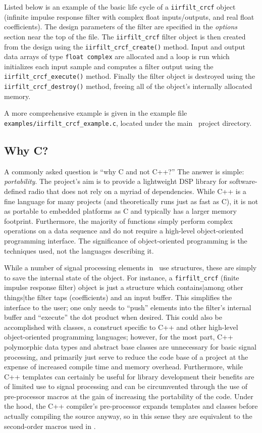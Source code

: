 Listed below is an example of the basic life cycle of a
{\tt iirfilt\_crcf} object (infinite impulse response filter with
complex float inputs/outputs, and real float coefficients).
The design parameters of the filter are specified in the {\em options}
section near the top of the file.
The {\tt iirfilt\_crcf} filter object is then created from the design
using the {\tt iirfilt\_crcf\_create()} method.
Input and output data arrays of type {\tt float complex} are allocated
and a loop is run which initializes each input sample and computes a
filter output using the {\tt iirfilt\_crcf\_execute()} method.
Finally the filter object is destroyed using the
{\tt iirfilt\_crcf\_destroy()} method,
freeing all of the object's internally allocated memory.
%

%
A more comprehensive example is given in the example file
{\tt examples/iirfilt\_crcf\_example.c},
located under the main \liquid\ project directory.

\subsection{Why C?}
\label{section:data_structures:why_C}
A commonly asked question is ``why C and not C++?''
The answer is simple: {\em portability}.
The project's aim is to provide a lightweight DSP library for
software-defined radio that does not rely on a myriad of dependencies.
While C++ is a fine language for many projects
(and theoretically runs just as fast as C),
it is not as portable to embedded platforms as C and typically has a
larger memory footprint.
Furthermore, the majority of functions simply perform complex operations on a
data sequence and do not require a high-level object-oriented programming
interface.
The significance of object-oriented programming is the techniques used,
not the languages describing it.

While a number of signal processing elements in \liquid\ use structures, these
are simply to save the internal state of the object.
For instance, a {\tt firfilt\_crcf} (finite impulse response filter) object
is just a structure which contains|among other things|the filter taps
(coefficients) and an input buffer.
This simplifies the interface to the user; one only needs to ``push'' elements
into the filter's internal buffer and ``execute'' the dot product when
desired.
This could also be accomplished with classes, a construct specific to C++ and
other high-level object-oriented programming languages;
however,
for the most part, C++ polymorphic data types and abstract base classes are
unnecessary for basic signal processing, and primarily just serve to reduce
the code base of a project at the expense of increased compile time and
memory overhead.
Furthermore, while C++ templates can certainly be useful for library
development
their benefits are of limited use to signal processing and can be circumvented
through the use of pre-processor macros at the gain of increasing the
portability of the code.
Under the hood, the C++ compiler's pre-processor expands templates and classes
before actually compiling the source anyway, so in this sense they are
equivalent to the second-order macros used in \liquid.


